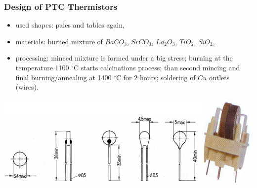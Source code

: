 \documentclass{beamer}
\begin{document}
	\begin{frame}
    \frametitle{Design of PTC Thermistors}
		\begin{itemize}
			\item used shapes: pales and tables again,
			\item materials: burned mixture of $BaCO_3$, $SrCO_3$, $La_2O_3$, $TiO_2$, $SiO_2$,
			\item processing: minced mixture is formed under a big stress; burning at the temperature 1100 $^\circ$C starts calcinations process; than second mincing and final burning/annealing at 1400 $^\circ$C for 2 hours; soldering of $Cu$ outlets (wires).
		\end{itemize}
		\begin{center}
			\includegraphics[scale=0.4]{obr12_prikladyPTC.png}
		\end{center}
  \end{frame}
\end{document}
